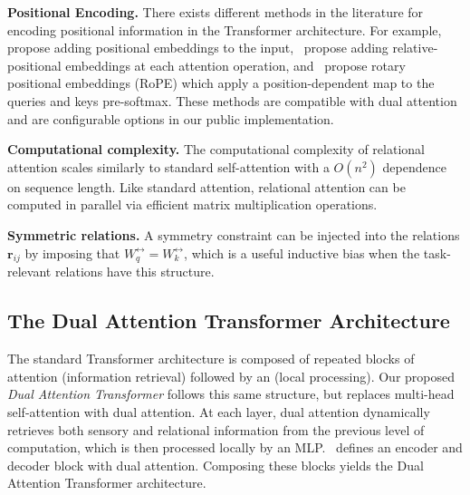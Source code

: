 \textbf{Positional Encoding.} There exists different methods in the literature for encoding positional information in the Transformer architecture. For example,~\citep{vaswani2017attention} propose adding positional embeddings to the input,~\citep{shawSelfAttentionRelativePosition2018b} propose adding relative-positional embeddings at each attention operation, and~\citep{suRoFormerEnhancedTransformer2023} propose rotary positional embeddings (RoPE) which apply a position-dependent map to the queries and keys pre-softmax. These methods are compatible with dual attention and are configurable options in our public implementation.

\textbf{Computational complexity.} The computational complexity of relational attention scales similarly to standard self-attention with a $O(n^2)$ dependence on sequence length. Like standard attention, relational attention can be computed in parallel via efficient matrix multiplication operations.

\textbf{Symmetric relations.} A symmetry constraint can be injected into the relations $\bm{r}_{ij}$ by imposing that $W_{q}^{\rel} = W_k^{\rel}$, which is a useful inductive bias when the task-relevant relations have this structure.


\subsection{The Dual Attention Transformer Architecture}

The standard Transformer architecture is composed of repeated blocks of attention (information retrieval) followed by an (local processing). Our proposed \textit{Dual Attention Transformer} follows this same structure, but replaces multi-head self-attention with dual attention.  At each layer, dual attention dynamically retrieves both sensory and relational information from the previous level of computation, which is then processed locally by an MLP.~ defines an encoder and decoder block with dual attention. Composing these blocks yields the Dual Attention Transformer architecture.

